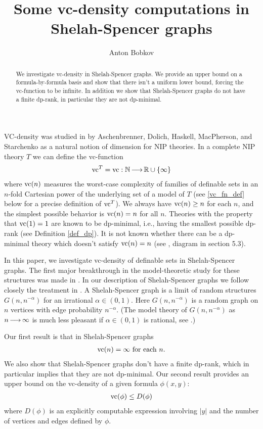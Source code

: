 \documentclass{amsart}
\title{Some vc-density computations in Shelah-Spencer graphs}
\author{Anton Bobkov}
\begin{document}
\begin{abstract}
  We investigate vc-density in Shelah-Spencer graphs.
  We provide an upper bound on a formula-by-formula basis and show that there isn't a uniform lower bound,
  forcing the vc-function to be infinite.
  In addition we show that Shelah-Spencer graphs do not have a finite dp-rank,
  in particular they are not dp-minimal.
\end{abstract}

\maketitle


VC-density was studied in \cite{density} by Aschenbrenner, Dolich, Haskell, MacPherson, and Starchenko as a natural notion of dimension for NIP theories.
In a complete NIP theory $T$ we can define the vc-function
\begin{align*}
  \operatorname{vc}^T = \operatorname{vc} : \mathbb{N} \operatorname{\longrightarrow} \mathbb{R} \cup \left\{\infty\right\}
\end{align*}
where $\operatorname{vc}(n)$ measures the worst-case complexity of families of definable sets in an $n$-fold Cartesian power of the underlying set of a model of $T$
(see \ref{vc_fn_def} below for a precise definition of $\operatorname{vc}^T$).
We always have $\operatorname{vc}(n) \geq n$ for each $n$, and the simplest possible behavior is $\operatorname{vc}(n) = n$ for all $n$. Theories with the property that $\operatorname{vc}(1) = 1$ are known to be dp-minimal, i.e., having the smallest possible dp-rank (see Definition \ref{def_dp}). It is not known whether there can be a dp-minimal theory which doesn't satisfy $\operatorname{vc}(n)=n$
(see \cite{density}, diagram in section 5.3).

In this paper, we investigate vc-density of definable sets in Shelah-Spencer graphs.
The first major breakthrough in the  model-theoretic study for these structures was made in \cite{spencer}.
In our description of Shelah-Spencer graphs we follow closely the treatment in \cite{laskowski}.
A Shelah-Spencer graph is a limit of random structures $G(n, n^{-\alpha})$ for an irrational $\alpha \in (0,1)$.
Here $G(n, n^{-\alpha})$ is a random graph on $n$ vertices with edge probability $n^{-\alpha}$.
(The model theory of $G(n, n^{-\alpha})$ as $n \operatorname{\longrightarrow} \infty$ is much less pleasant if $\alpha \in (0,1)$ is rational, see \cite{rational}.)

Our first result is that in Shelah-Spencer graphs
\begin{align*}
  \operatorname{vc}(n) = \infty \text{ for each } n.
\end{align*}
We also show that Shelah-Spencer graphs don't have a finite dp-rank, which in particular implies that they are not dp-minimal.
Our second result provides an upper bound on the vc-density of a given formula $\phi(x, y)$:
\begin{align*}
  \operatorname{vc}(\phi) \leq D(\phi)
\end{align*}
where $D(\phi)$ is an explicitly computable expression involving $|y|$ and the number of vertices and edges defined by $\phi$.
\end{document}
